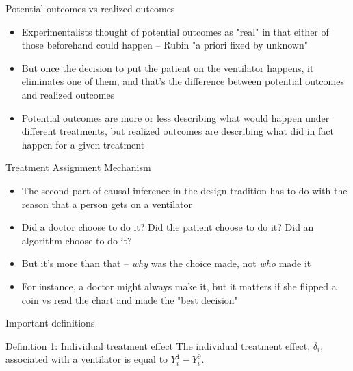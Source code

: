 \documentclass{beamer}
\begin{document}
\begin{frame}{Potential outcomes vs realized outcomes}
	\begin{itemize}
	\item Experimentalists thought of potential outcomes as "real" in that either of those beforehand could happen -- Rubin "a priori fixed by unknown"
	\item But once the decision to put the patient on the ventilator happens, it eliminates one of them, and that's the difference between potential outcomes and realized outcomes
	\item Potential outcomes are more or less describing what would happen under different treatments, but realized outcomes are describing what did in fact happen for a given treatment
  \end{itemize}
\end{frame}


\begin{frame}{Treatment Assignment Mechanism }

\begin{itemize}
\item The second part of causal inference in the design tradition has to do with the reason that a person gets on a ventilator
\item Did a doctor choose to do it?  Did the patient choose to do it?  Did an algorithm choose to do it?
\item But it's more than that -- \emph{why} was the choice made, not \emph{who} made it
\item For instance, a doctor might always make it, but it matters if she flipped a coin vs read the chart and made the "best decision"
\end{itemize}
\end{frame}

\begin{frame}{Important definitions}

    \begin{block}{Definition 1: Individual treatment effect}
      The individual treatment effect,  $\delta_i$, associated with a ventilator is equal to $Y_i^1-Y_i^0$.
    \end{block}
\end{frame}
\end{document}
